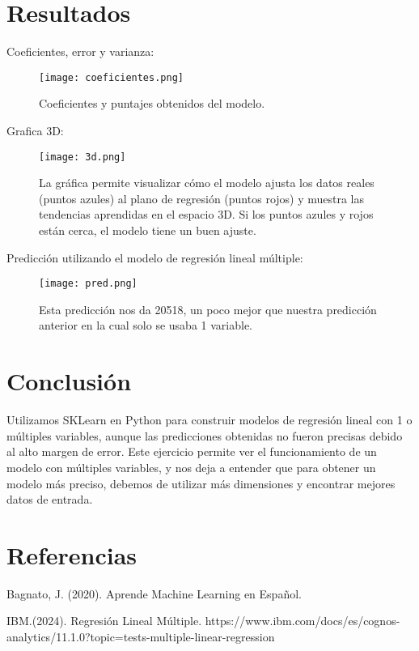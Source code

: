 \documentclass{pssbmac}
\begin{document}
\section{Resultados}

Coeficientes, error y varianza: 

\begin{figure}[H]
\centering
\texttt{[image: coeficientes.png]}
\caption{ {\small Coeficientes y puntajes obtenidos del modelo.}}
\label{figura01}
\end{figure}




\vspace{5cm}
Grafica 3D:

\begin{figure}[H]
\centering
\texttt{[image: 3d.png]}
\caption{ {\small La gráfica permite visualizar cómo el modelo ajusta los datos reales (puntos azules) al plano de regresión (puntos rojos) y muestra las tendencias aprendidas en el espacio 3D. Si los puntos azules y rojos están cerca, el modelo tiene un buen ajuste.}}
\label{figura02}
\end{figure}


Predicción utilizando el modelo de regresión lineal múltiple:

\begin{figure}[H]
\centering
\texttt{[image: pred.png]}
\caption{ {\small Esta predicción nos da 20518, un poco mejor que nuestra predicción anterior en la cual solo se usaba 1 variable.}}
\label{figura03}
\end{figure}


\section{Conclusión}
Utilizamos SKLearn en Python para construir modelos de regresión lineal con 1 o múltiples variables, aunque las predicciones obtenidas no fueron precisas debido al alto margen de error. Este ejercicio permite ver el funcionamiento de un modelo con múltiples variables, y nos deja a entender que para obtener un modelo más preciso, debemos de utilizar más dimensiones y encontrar mejores datos de entrada.

\section{Referencias}
Bagnato, J. (2020). Aprende Machine Learning en Español.

\vspace{.3cm}
IBM.(2024). Regresión Lineal Múltiple. https://www.ibm.com/docs/es/cognos-analytics/11.1.0?topic=tests-multiple-linear-regression
\end{document}
